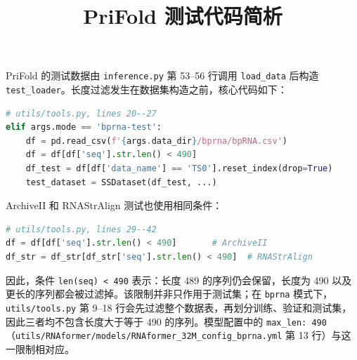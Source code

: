 \documentclass[UTF8,a4paper,11pt]{ctexart}
\title{PriFold 测试代码简析}
\author{}
\date{}
\begin{document}
\maketitle

PriFold 的测试数据由 \texttt{inference.py} 第 53--56 行调用
\texttt{load\_data} 后构造 \texttt{test\_loader}。长度过滤发生在数据集构造之前，核心代码如下：

\begin{lstlisting}[language=Python]
# utils/tools.py, lines 20--27
elif args.mode == 'bprna-test':
    df = pd.read_csv(f'{args.data_dir}/bprna/bpRNA.csv')
    df = df[df['seq'].str.len() < 490]
    df_test = df[df['data_name'] == 'TS0'].reset_index(drop=True)
    test_dataset = SSDataset(df_test, ...)
\end{lstlisting}

ArchiveII 和 RNAStrAlign 测试也使用相同条件：

\begin{lstlisting}[language=Python]
# utils/tools.py, lines 29--42
df = df[df['seq'].str.len() < 490]       # ArchiveII
df_str = df_str[df_str['seq'].str.len() < 490]  # RNAStrAlign
\end{lstlisting}

因此，条件 \texttt{len(seq) < 490} 表示：长度 489 的序列仍会保留，长度为 490 以及更长的序列都会被过滤掉。该限制并非只作用于测试集；在 \texttt{bprna} 模式下，\texttt{utils/tools.py} 第 9--18 行会先过滤整个数据表，再划分训练、验证和测试集，因此三者均不包含长度大于等于 490 的序列。模型配置中的 \texttt{max\_len: 490}（\texttt{utils/RNAformer/models/RNAformer\_32M\_config\_bprna.yml} 第 13 行）与这一限制相对应。
\end{document}

